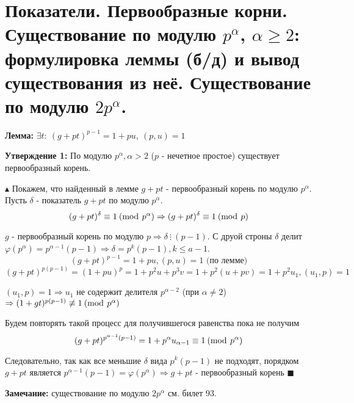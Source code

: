 \section{Показатели. Первообразные корни. Существование по модулю $p^\alpha$, $\alpha \geq 2$: формулировка леммы (б/д) и вывод существования из неё. Существование по модулю $2p^\alpha$.}
\par \textbf{Лемма:} $\exists t: \: (g+pt)^{p-1}=1+pu, \: (p,u)=1$
\par \par \textbf{Утверждение 1:} По модулю $p^\alpha, \alpha>2$ ($p$ - нечетное простое) существует первообразный корень.
\par $\blacktriangle$ Покажем, что найденный в лемме $g+pt$ - первообразный корень по модулю $p^\alpha$. Пусть $\delta$ - показатель $g+pt$ по модулю $p^\alpha$.
$$(g+pt)^\delta\equiv 1 \: (\operatorname{mod} \: p^\alpha) \Rightarrow (g+pt)^\delta\equiv 1 \: (\operatorname{mod} \: p)$$
\par $g$ - первообразный корень по модулю $p \Rightarrow \delta \: \vdots \: (p-1)$. С друой строны $\delta$ делит $\varphi(p^\alpha)=p^{\alpha-1}(p-1) \Rightarrow \delta=p^k(p-1), k \leq a-1$.
$$(g+pt)^{p-1}=1+pu, (p,u)=1 \text{ (по лемме)}$$
$$(g+pt)^{p(p-1)}=(1+pu)^p=1+p^2u+p^3v=1+p^2(u+pv)=1+p^2u_1, (u_1, p)=1$$
\par $(u_1, p)=1 \Rightarrow u_1$ не содержит делителя $p^{\alpha-2}$ (при $\alpha \neq 2$) $\Rightarrow (1+gt)^{p(p-1)} \not\equiv 1 \: (\operatorname{mod} \: p^\alpha)$
\par Будем повторять такой процесс для получившегося равенства пока не получим
$$(g+pt)^{p^{\alpha-1}(p-1)}=1+p^\alpha u_{\alpha-1} \equiv 1 \: (\operatorname{mod} \: p^\alpha)$$
\par Следовательно, так как все меньшие $\delta$ вида $p^k(p-1)$ не подходят, порядком $g+pt$ является $p^{\alpha-1}(p-1)=\varphi(p^\alpha) \Rightarrow g+pt$ - первообразный корень $\blacksquare$
\par \textbf{Замечание:} существование по модулю $2p^\alpha$ см. билет 93.


